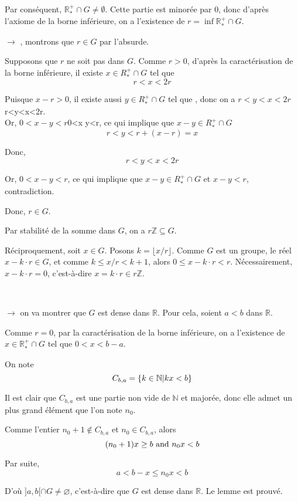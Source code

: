 Par cons{\'e}quent, $\mathbb{R}^+_{\ast} \cap G \neq \emptyset$. Cette partie
est minor{\'e}e par 0, donc d'apr{\`e}s l'axiome de la borne inf{\'e}rieure,
on a l'existence de $r = \inf \mathbb{R}^+_{\ast} \cap G$.

$\rightarrow$ , montrons que $r \in G$ par l'absurde.

Supposons que $r$ ne soit pas dans $G$. Comme $r > 0$, d'apr{\`e}s la
caract{\'e}risation de la borne inf{\'e}rieure, il existe $x \in R_{\ast}^+
\cap G$ tel que
\[ r < x < 2 r \]


Puisque $x - r > 0$, il existe aussi $y \in R_{\ast}^+ \cap G$ tel que , donc
on a $r < y < x < 2 r$r<y<x<2r.\\
Or, $0 < x - y < r$0<x  y<r, ce qui implique que $x - y
\in R_{\ast}^+ \cap G$
\[ r < y < r + (x - r) = x \]


Donc,
\[ r < y < x < 2 r \]


Or, $0 < x - y < r$, ce qui implique que $x - y \in R_{\ast}^+ \cap G$ et $x -
y < r$, contradiction.

Donc, $r \in G$.

Par stabilit{\'e} de la somme dans $G$, on a $r\mathbb{Z} \subseteq G$.

R{\'e}ciproquement, soit $x \in G$. Posons $k = \lfloor x / r \rfloor$. Comme
$G$ est un groupe, le r{\'e}el $x - k \cdot r \in G$, et comme $k \leq x / r <
k + 1$, alors $0 \leq x - k \cdot r < r$. N{\'e}cessairement, $x - k \cdot r =
0$, c'est-{\`a}-dire $x = k \cdot r \in r\mathbb{Z}$.

\

$\rightarrow$  on va montrer que $G$ est dense dans
$\mathbb{R}$. Pour cela, soient $a < b$ dans $\mathbb{R}$.

Comme $r = 0$, par la caract{\'e}risation de la borne inf{\'e}rieure, on a
l'existence de $x \in \mathbb{R}^+_{\ast} \cap G$ tel que $0 < x < b - a$.

On note
\[ C_{b, a} =\{k \in \mathbb{N} |  kx < b\} \]


Il est clair que $C_{b, a}$ est une partie non vide de $\mathbb{N}$ et
major{\'e}e, donc elle admet un plus grand {\'e}l{\'e}ment que l'on note
$n_0$.

Comme l'entier $n_0 + 1 \nin C_{b, a}$ et $n_0 \in C_{b, a}$, alors
\[ (n_0 + 1) x \geq b \text{ and } n_0 x < b \]


Par suite,
\[ a < b - x \leq n_0 x < b \]


D'o{\`u} $] a, b [\cap G \neq \varnothing$, c'est-{\`a}-dire que $G$ est dense
dans $\mathbb{R}$. Le lemme est prouv{\'e}.

